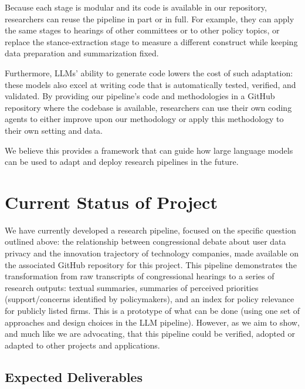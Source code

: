 \documentclass[11pt]{article}
\begin{document}
Because each stage is modular and its code is available in our repository, researchers can reuse the pipeline in part or in full. For example, they can apply the same stages to hearings of other committees or to other policy topics, or replace the stance-extraction stage to measure a different construct while keeping data preparation and summarization fixed.

Furthermore, LLMs' ability to generate code lowers the cost of such adaptation: these models also excel at writing code that is automatically tested, verified, and validated. By providing our pipeline's code and methodologies in a GitHub repository where the codebase is available, researchers can use their own coding agents to either improve upon our methodology or apply this methodology to their own setting and data.

We believe this provides a framework that can guide how large language models can be used to adapt and deploy research pipelines in the future.

\section{Current Status of Project}

We have currently developed a research pipeline, focused on the specific question outlined above: the relationship between congressional debate about user data privacy and the innovation trajectory of technology companies, made available on the associated GitHub repository for this project. This pipeline demonstrates the transformation from raw transcripts of congressional hearings to a series of research outputs: textual summaries, summaries of perceived priorities (support/concerns identified by policymakers), and an index for policy relevance for publicly listed firms. This is a prototype of what can be done (using one set of approaches and design choices in the LLM pipeline). However, as we aim to show, and much like we are advocating, that this pipeline could be verified, adopted or adapted to other projects and applications.

\subsection{Expected Deliverables}
\end{document}
